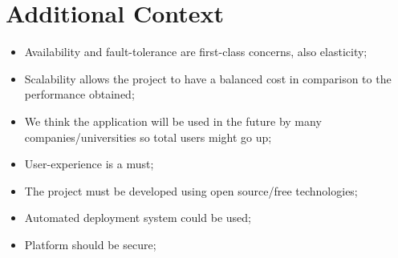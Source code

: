 \documentclass[a4paper,11pt]{report}
\begin{document}
	\chapter*{Additional Context}
	\begin{itemize}
		\item Availability and fault-tolerance are first-class concerns, also elasticity;
		\item Scalability allows the project to have a balanced cost in comparison to the performance obtained; 
		\item We think the application will be used in the future by many companies/universities so total users might go up;
		\item User-experience is a must;
		\item The project must be developed using open source/free technologies;
		\item Automated deployment system could be used;
		\item Platform should be secure;
	\end{itemize}
\end{document}
